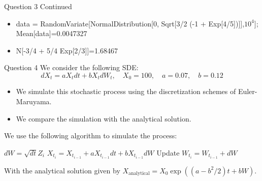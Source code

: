\documentclass[compress,12pt]{beamer}
\begin{document}
\begin{frame}{Question 3 Continued}
    \begin{itemize}
        \item data = RandomVariate[NormalDistribution[0, Sqrt[3/2 (-1 + Exp[4/5])]],$10^4$];
        Mean[data]=0.0047327
        \item N[-3/4 + 5/4 Exp[2/3]]=1.68467
        

    \end{itemize}
    
\end{frame}




\begin{frame}{Question 4}
    We consider the following SDE:
    \begin{equation*}
        dX_t = aX_t dt + bX_t dW_t, \quad X_0 = 100, \quad a = 0.07, \quad b = 0.12
    \end{equation*}

    \begin{itemize}
        \item We simulate this stochastic process using the discretization schemes of Euler-Maruyama.
        \item We compare the simulation with the analytical solution.
    \end{itemize}

    We use the following algorithm to simulate the process:
     
    \begin{algorithmic}
            \State $dW = \sqrt{dt} Z_i$
            \State $X_{t_i} = X_{t_{i-1}} + aX_{t_{i-1}} dt + bX_{t_{i-1}} dW$
            \State Update $W_{t_i} = W_{t_{i-1}} + dW$
        \EndFor
    \end{algorithmic}

    With the analytical solution given by $X_{\text{analytical}} = X_0 \exp((a - b^2/2)t + bW)$.
\end{frame}
\end{document}
